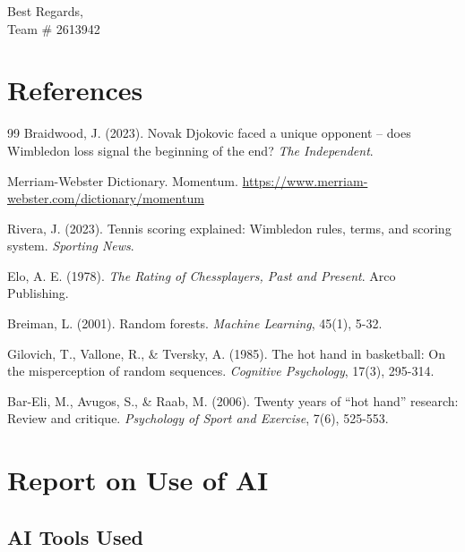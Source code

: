 \documentclass{mcmthesis}
\begin{document}
\begin{memo}[Memorandum]
\begin{flushright}  %
    \vspace{1em}  %
    Best Regards, \\  %
    
    Team  \# 2613942  %
\end{flushright}
\end{memo}

\section{References}
\begin{thebibliography}{99}
 Braidwood, J. (2023). Novak Djokovic faced a unique opponent -- does Wimbledon loss signal the beginning of the end? \emph{The Independent}.

 Merriam-Webster Dictionary. Momentum. \url{https://www.merriam-webster.com/dictionary/momentum}

 Rivera, J. (2023). Tennis scoring explained: Wimbledon rules, terms, and scoring system. \emph{Sporting News}.

 Elo, A. E. (1978). \emph{The Rating of Chessplayers, Past and Present}. Arco Publishing.

 Breiman, L. (2001). Random forests. \emph{Machine Learning}, 45(1), 5-32.

 Gilovich, T., Vallone, R., \& Tversky, A. (1985). The hot hand in basketball: On the misperception of random sequences. \emph{Cognitive Psychology}, 17(3), 295-314.

 Bar-Eli, M., Avugos, S., \& Raab, M. (2006). Twenty years of ``hot hand'' research: Review and critique. \emph{Psychology of Sport and Exercise}, 7(6), 525-553.
\end{thebibliography}

\section*{Report on Use of AI}

\subsection*{AI Tools Used}
\end{document}

